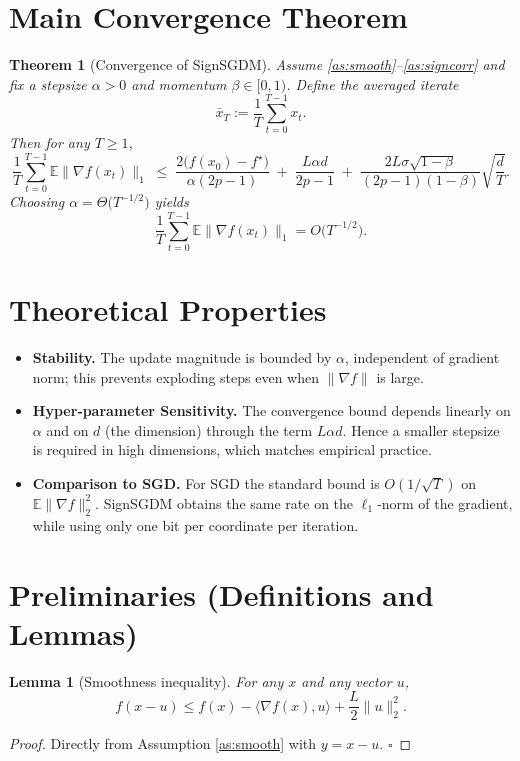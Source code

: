 \documentclass{article}
\newtheorem{theorem}{Theorem}
\newtheorem{lemma}{Lemma}
\begin{document}
\section*{Main Convergence Theorem}
\begin{theorem}[Convergence of SignSGDM]\label{thm:main}
Assume \ref{as:smooth}–\ref{as:signcorr} and fix a stepsize $\alpha>0$ and momentum $\beta\in[0,1)$.  
Define the averaged iterate
\[
\bar{x}_T:=\frac{1}{T}\sum_{t=0}^{T-1}x_t .
\]
Then for any $T\ge1$,
\[
\frac{1}{T}\sum_{t=0}^{T-1}\mathbb{E}\bigl\|\nabla f(x_t)\bigr\|_{1}
\;\le\;
\frac{2\bigl(f(x_0)-f^\star\bigr)}{\alpha (2p-1)}\;+\;
\frac{L\alpha d}{2p-1}\;+\;
\frac{2L\sigma\sqrt{1-\beta}}{(2p-1)(1-\beta)}\sqrt{\frac{d}{T}} .
\tag{3}
\]
Choosing $\alpha=\Theta\!\bigl(T^{-1/2}\bigr)$ yields
\[
\frac{1}{T}\sum_{t=0}^{T-1}\mathbb{E}\bigl\|\nabla f(x_t)\bigr\|_{1}=O\!\bigl(T^{-1/2}\bigr).
\]
\end{theorem}

\section*{Theoretical Properties}
\begin{itemize}
\item \textbf{Stability.} The update magnitude is bounded by $\alpha$, independent of gradient norm; this prevents exploding steps even when $\|\nabla f\|$ is large.
\item \textbf{Hyper‑parameter Sensitivity.} The convergence bound depends linearly on $\alpha$ and on $d$ (the dimension) through the term $L\alpha d$. Hence a smaller stepsize is required in high dimensions, which matches empirical practice.
\item \textbf{Comparison to SGD.} For SGD the standard bound is $O(1/\sqrt{T})$ on $\mathbb{E}\|\nabla f\|_2^{2}$.  SignSGDM obtains the same rate on the $\ell_1$‑norm of the gradient, while using only one bit per coordinate per iteration.
\end{itemize}

\newpage
\section*{Preliminaries (Definitions and Lemmas)}
\begin{lemma}[Smoothness inequality]\label{lem:smooth}
For any $x$ and any vector $u$,
\[
f(x-u)\le f(x)-\langle\nabla f(x),u\rangle+\frac{L}{2}\|u\|_2^{2}.
\]
\end{lemma}
\begin{proof}
Directly from Assumption \ref{as:smooth} with $y=x-u$. \hfill $\square$
\end{proof}
\end{document}
